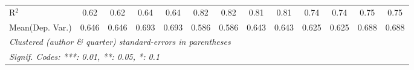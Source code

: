 \begin{tabular}{lcccccccccccc}
   R$^2$                                    & 0.62         & 0.62    & 0.64    & 0.64    & 0.82         & 0.82     & 0.81          & 0.81    & 0.74         & 0.74         & 0.75        & 0.75\\  
Mean(Dep. Var.) & 0.646 & 0.646 & 0.693 & 0.693 & 0.586 & 0.586 & 0.643 & 0.643 & 0.625 & 0.625 & 0.688 & 0.688 \\
   \midrule \midrule
   \multicolumn{13}{l}{\emph{Clustered (author \& quarter) standard-errors in parentheses}}\\
   \multicolumn{13}{l}{\emph{Signif. Codes: ***: 0.01, **: 0.05, *: 0.1}}\\
\end{tabular}
\par\endgroup
